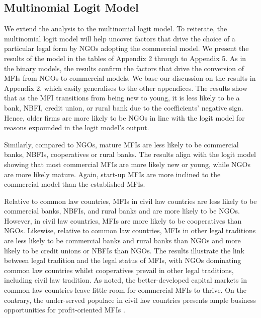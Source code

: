 \documentclass[a4paper, nobind]{templates/ociamthesis}
\begin{document}
\newpage

\hypertarget{multinomial-logit-model}{%
\subsection{Multinomial Logit Model}\label{multinomial-logit-model}}

We extend the analysis to the multinomial logit model. To reiterate, the multinomial logit model will help uncover factors that drive the choice of a particular legal form by NGOs adopting the commercial model. We present the results of the model in the tables of Appendix 2 through to Appendix 5. As in the binary models, the results confirm the factors that drive the conversion of MFIs from NGOs to commercial models. We base our discussion on the results in Appendix 2, which easily generalises to the other appendices. The results show that as the MFI transitions from being new to young, it is less likely to be a bank, NBFI, credit union, or rural bank due to the coefficients' negative sign. Hence, older firms are more likely to be NGOs in line with the logit model for reasons expounded in the logit model's output.

Similarly, compared to NGOs, mature MFIs are less likely to be commercial banks, NBFIs, cooperatives or rural banks. The results align with the logit model showing that most commercial MFIs are more likely new or young, while NGOs are more likely mature. Again, start-up MFIs are more inclined to the commercial model than the established MFIs.

Relative to common law countries, MFIs in civil law countries are less likely to be commercial banks, NBFIs, and rural banks and are more likely to be NGOs. However, in civil law countries, MFIs are more likely to be cooperatives than NGOs. Likewise, relative to common law countries, MFIs in other legal traditions are less likely to be commercial banks and rural banks than NGOs and more likely to be credit unions or NBFIs than NGOs. The results illustrate the link between legal tradition and the legal status of MFIs, with NGOs dominating common law countries whilst cooperatives prevail in other legal traditions, including civil law tradition. As noted, the better-developed capital markets in common law countries leave little room for commercial MFIs to thrive. On the contrary, the under-served populace in civil law countries presents ample business opportunities for profit-oriented MFIs \autocite{d2013unsubsidized,mia2017mission}.
\end{document}
